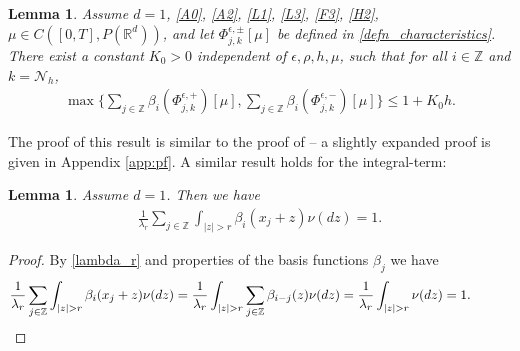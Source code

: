 \documentclass[a4paper,  twoside, 10pt, leqno]{amsart}
\newcommand{\Z}{\mathbb{Z}}
\newcommand{\rd}{\mathbb{R}^d}
\newtheorem{lemma}[thm]{Lemma}
\theoremstyle{remark}
\theoremstyle{definition}
\begin{document}
 \begin{lemma} \label{lem:bound_char}
Assume $d=1$, \ref{A0}, \ref{A2}, \ref{L1}, \ref{L3}, \ref{F3}, \ref{H2},  $\mu \in  C ( [0,T], P ( \rd ))$, and  let $\Phi^{\epsilon,\pm}_{j,k}[\mu]$ be defined in \eqref{defn_characteristics}. There exist a constant $K_0>0$ independent of $\epsilon, \rho, h,\mu$, such that for all $i \in \Z$ and $k=\mathcal{N}_h$, 
 \begin{align*}
 \max\Big\{ \sum_{j\in \Z}\beta_i(\Phi^{\epsilon,+}_{j,k})[\mu],\sum_{j\in \Z} \beta_i(\Phi^{\epsilon,-}_{j,k})[\mu]  \Big\} \leq 1+K_0 h. 
 \end{align*}
 \end{lemma}
The proof of this result is similar to the proof of \cite[Lemma 3.8]{carliniSilva2014semi1st} -- 
a slightly expanded proof is given in Appendix \ref{app:pf}. A similar result holds for the integral-term:
\begin{lemma} \label{lem:bound_jump_char}
Assume $d=1$.  Then we have 
\begin{align*}
\frac{1}{\lambda_r} \sum_{j\in \Z} \int_{|z|>r} \beta_i(x_j+z) \nu(dz) =1. 
\end{align*}
\end{lemma}


\begin{proof}
By \eqref{lambda_r} and properties of the basis functions $\beta_j$ we have
\begin{align*}
    \frac{1}{\lambda_r} \sum_{j\in \Z} \int_{|z|>r} \beta_i(x_j+z) \nu(dz) = 
    \frac{1}{\lambda_r} \int_{|z|>r} \sum_{j\in \Z} \beta_{i-j}(z) \nu(dz) =\frac{1}{\lambda_r} \int_{|z|>r} \nu(dz) =1.  \qquad \quad \qedhere 
\end{align*}
\end{proof} 

\medskip
\end{document}

